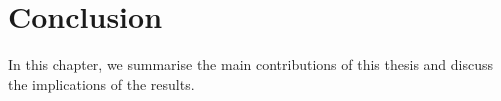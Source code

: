 \chapter{Conclusion}
\label{chap:conclusion}

In this chapter, we summarise the main contributions of this thesis and discuss the implications of the results.


